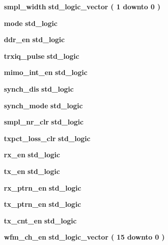 \begin{DoxyCompactItemize}
\item 
{\bf smpl\+\_\+width} {\bfseries {\bfseries \textcolor{comment}{std\+\_\+logic\+\_\+vector}\textcolor{vhdlchar}{ }\textcolor{vhdlchar}{(}\textcolor{vhdlchar}{ }\textcolor{vhdlchar}{ } \textcolor{vhdldigit}{1} \textcolor{vhdlchar}{ }\textcolor{keywordflow}{downto}\textcolor{vhdlchar}{ }\textcolor{vhdlchar}{ } \textcolor{vhdldigit}{0} \textcolor{vhdlchar}{ }\textcolor{vhdlchar}{)}\textcolor{vhdlchar}{ }}} 
\item 
{\bf mode} {\bfseries {\bfseries \textcolor{comment}{std\+\_\+logic}\textcolor{vhdlchar}{ }}} 
\item 
{\bf ddr\+\_\+en} {\bfseries {\bfseries \textcolor{comment}{std\+\_\+logic}\textcolor{vhdlchar}{ }}} 
\item 
{\bf trxiq\+\_\+pulse} {\bfseries {\bfseries \textcolor{comment}{std\+\_\+logic}\textcolor{vhdlchar}{ }}} 
\item 
{\bf mimo\+\_\+int\+\_\+en} {\bfseries {\bfseries \textcolor{comment}{std\+\_\+logic}\textcolor{vhdlchar}{ }}} 
\item 
{\bf synch\+\_\+dis} {\bfseries {\bfseries \textcolor{comment}{std\+\_\+logic}\textcolor{vhdlchar}{ }}} 
\item 
{\bf synch\+\_\+mode} {\bfseries {\bfseries \textcolor{comment}{std\+\_\+logic}\textcolor{vhdlchar}{ }}} 
\item 
{\bf smpl\+\_\+nr\+\_\+clr} {\bfseries {\bfseries \textcolor{comment}{std\+\_\+logic}\textcolor{vhdlchar}{ }}} 
\item 
{\bf txpct\+\_\+loss\+\_\+clr} {\bfseries {\bfseries \textcolor{comment}{std\+\_\+logic}\textcolor{vhdlchar}{ }}} 
\item 
{\bf rx\+\_\+en} {\bfseries {\bfseries \textcolor{comment}{std\+\_\+logic}\textcolor{vhdlchar}{ }}} 
\item 
{\bf tx\+\_\+en} {\bfseries {\bfseries \textcolor{comment}{std\+\_\+logic}\textcolor{vhdlchar}{ }}} 
\item 
{\bf rx\+\_\+ptrn\+\_\+en} {\bfseries {\bfseries \textcolor{comment}{std\+\_\+logic}\textcolor{vhdlchar}{ }}} 
\item 
{\bf tx\+\_\+ptrn\+\_\+en} {\bfseries {\bfseries \textcolor{comment}{std\+\_\+logic}\textcolor{vhdlchar}{ }}} 
\item 
{\bf tx\+\_\+cnt\+\_\+en} {\bfseries {\bfseries \textcolor{comment}{std\+\_\+logic}\textcolor{vhdlchar}{ }}} 
\item 
{\bf wfm\+\_\+ch\+\_\+en} {\bfseries {\bfseries \textcolor{comment}{std\+\_\+logic\+\_\+vector}\textcolor{vhdlchar}{ }\textcolor{vhdlchar}{(}\textcolor{vhdlchar}{ }\textcolor{vhdlchar}{ } \textcolor{vhdldigit}{15} \textcolor{vhdlchar}{ }\textcolor{keywordflow}{downto}\textcolor{vhdlchar}{ }\textcolor{vhdlchar}{ } \textcolor{vhdldigit}{0} \textcolor{vhdlchar}{ }\textcolor{vhdlchar}{)}\textcolor{vhdlchar}{ }}} 

\end{DoxyCompactItemize}
